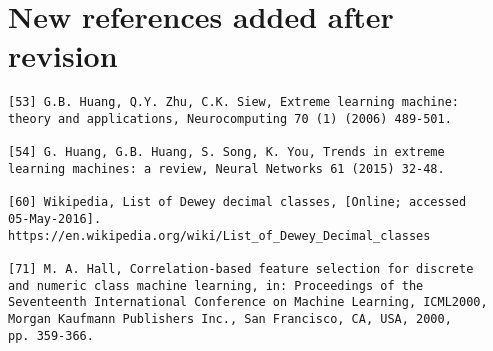\documentclass[preprint]{elsarticle}
\begin{document}
\section{New references added after revision}

\begin{verbatim}
[53] G.B. Huang, Q.Y. Zhu, C.K. Siew, Extreme learning machine: 
theory and applications, Neurocomputing 70 (1) (2006) 489-501.

[54] G. Huang, G.B. Huang, S. Song, K. You, Trends in extreme 
learning machines: a review, Neural Networks 61 (2015) 32-48.

[60] Wikipedia, List of Dewey decimal classes, [Online; accessed 
05-May-2016]. https://en.wikipedia.org/wiki/List_of_Dewey_Decimal_classes

[71] M. A. Hall, Correlation-based feature selection for discrete 
and numeric class machine learning, in: Proceedings of the 
Seventeenth International Conference on Machine Learning, ICML2000, 
Morgan Kaufmann Publishers Inc., San Francisco, CA, USA, 2000, 
pp. 359-366.
\end{verbatim}
\end{document}
